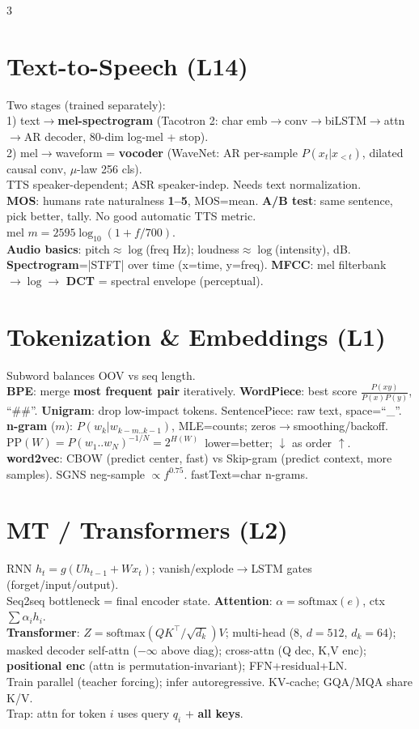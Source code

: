 \documentclass[12pt]{extarticle} %
\newcommand{\sub}[1]{\textcolor{key}{\textbf{#1}}}
\newcommand{\fb}[1]{\colorbox{yellow!30}{$#1$}} %
\begin{document}
\begin{multicols}{3}
\section{Text-to-Speech \textnormal{(L14)}}
Two stages (trained separately):\\
1) text$\to$\sub{mel-spectrogram} (Tacotron 2: char emb$\to$conv$\to$biLSTM$\to$attn$\to$AR decoder, 80-dim log-mel + stop).\\
2) mel$\to$waveform = \sub{vocoder} (WaveNet: AR per-sample $P(x_t|x_{<t})$, dilated causal conv, $\mu$-law 256 cls).\\
TTS speaker-dependent; ASR speaker-indep. Needs text normalization.\\
\sub{MOS}: humans rate naturalness \sub{1–5}, MOS=mean. \sub{A/B test}: same sentence, pick better, tally. No good automatic TTS metric.\\
mel $m=2595\log_{10}(1{+}f/700)$.\\
\sub{Audio basics}: pitch$\approx\log$(freq Hz); loudness$\approx\log$(intensity), dB. \sub{Spectrogram}=|STFT| over time (x=time, y=freq). \sub{MFCC}: mel filterbank $\to\log\to$ \sub{DCT} = spectral envelope (perceptual).

\section{Tokenization \& Embeddings \textnormal{(L1)}}
Subword balances OOV vs seq length.\\
\sub{BPE}: merge \sub{most frequent pair} iteratively. \sub{WordPiece}: best score $\tfrac{P(xy)}{P(x)P(y)}$, ``\#\#''. \sub{Unigram}: drop low-impact tokens. SentencePiece: raw text, space=``\_''.\\
\sub{n-gram} ($m$): $P(w_k|w_{k-m..k-1})$, MLE=counts; zeros$\to$smoothing/backoff.\\
\fb{\text{PP}(W)=P(w_1..w_N)^{-1/N}=2^{H(W)}}\ lower=better; $\downarrow$ as order $\uparrow$.\\
\sub{word2vec}: CBOW (predict center, fast) vs Skip-gram (predict context, more samples). SGNS neg-sample $\propto f^{0.75}$. fastText=char n-grams.

\section{MT / Transformers \textnormal{(L2)}}
RNN $h_t{=}g(Uh_{t-1}{+}Wx_t)$; vanish/explode$\to$LSTM gates (forget/input/output).\\
Seq2seq bottleneck = final encoder state. \sub{Attention}: $\alpha{=}\text{softmax}(e)$, ctx $\sum\alpha_i h_i$.\\
\sub{Transformer}: $Z{=}\text{softmax}(QK^\top/\sqrt{d_k})V$; multi-head (8, $d{=}512$, $d_k{=}64$); masked decoder self-attn ($-\infty$ above diag); cross-attn (Q dec, K,V enc); \sub{positional enc} (attn is permutation-invariant); FFN+residual+LN.\\
Train parallel (teacher forcing); infer autoregressive. KV-cache; GQA/MQA share K/V.\\
Trap: attn for token $i$ uses query $q_i$ + \sub{all keys}.


\end{multicols}
\end{document}
